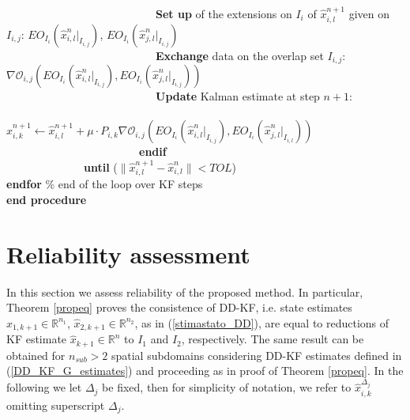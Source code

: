 \documentclass[smallcondensed]{svjour3}
\begin{document}
\begin{table}{}
\ \ \ \ \ \ \ \ \ \ \ \ \ \  \ \ \ \ \ \ \ \ \ \ \ \ \ \textbf{Set up}  of  the extensions on ${I}_{i}$ of $\widehat{x}_{i,l}^{n+1}$ given  on $I_{i,j}$: $EO_{I_{i}}(\widehat{x}_{i,l}^{n}|_{{I}_{i,j}})$, $EO_{I_{i}}(\widehat{x}_{j,l}^{n}|_{{I}_{i,j}})$\\
\ \ \ \ \ \ \ \ \ \ \ \ \ \  \ \ \ \ \ \ \ \ \ \ \ \ \  \textbf{Exchange} data on the overlap set $I_{i,j}$:  $\nabla \mathcal{O}_{i,j}(EO_{I_{i}}(\widehat{x}_{i,l}^{n}|_{I_{i,j}}),EO_{I_{i}}(\widehat{x}_{j,l}^{n}|_{I_{i,j}}))$ \\
\ \ \ \ \ \ \ \ \ \ \ \ \ \  \ \ \ \ \ \ \ \ \ \ \ \ \ \textbf{Update} Kalman estimate at step $n+1$:\\ \ \ \ \ \ \ \ \ \ \ \ \ \ \  \ \ \ \ \ \ \ \ \ \ \ \ \ $\widehat{x}_{i,k}^{n+1}\leftarrow \widehat{x}_{i,l}^{n+1}+{\mu}\cdot  P_{i,k} \nabla \mathcal{O}_{i,j}(EO_{I_{i}}(\widehat{x}_{i,l}^{n}|_{I_{i,j}}),EO_{I_{i}}(\widehat{x}_{j,l}^{n}|_{I_{i,l}}))$ \\
\ \ \ \ \ \ \ \ \ \ \ \ \ \  \ \ \ \ \ \ \ \ \ \ \textbf{endif}\\
\ \ \ \ \ \ \ \ \ \ \ \ \ \ \textbf{until} ($\| \widehat{x}_{i,l}^{n+1}-\widehat{x}_{i,l}^{n} \| <TOL$)\\
\textbf{endfor} \% end of the loop over KF steps\\
\textbf{end procedure}\\ 
\end{table}

\section{Reliability assessment}

\noindent In this section we assess  reliability of the proposed method. In particular,  Theorem \ref{propeq}  proves the consistence of DD-KF, i.e.  state estimates $\widehat{x}_{1,k+1}\in \mathbb{R}^{n_{1}}$, $\widehat{x}_{2,k+1}\in \mathbb{R}^{n_{2}}$, as in (\ref{stimastato_DD}), are equal to  reductions of KF estimate $\widehat{x}_{k+1}\in \mathbb{R}^{n}$ to  $I_{1}$ and  $I_{2}$, respectively.  The same result can be obtained for  $n_{sub}>2$  spatial subdomains considering DD-KF estimates defined in (\ref{DD_KF_G_estimates}) and  proceeding as in proof of Theorem \ref{propeq}. In the following we let  $\Delta_{j}$ be fixed, then for simplicity of notation, we refer to $\widehat{x}_{i,k}^{\Delta_{j}}$ omitting superscript $\Delta_{j}$.
\end{document}
